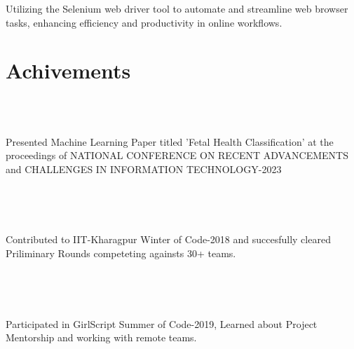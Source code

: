 \documentclass[]{BismayResume}
\begin{document}
\begin{minipage}[t]{0.70\textwidth}
\begin{tightemize}
\end{tightemize}
\sectionsep

\begin{tightemize}
\sectionsep
\item Utilizing the Selenium web driver tool to automate and streamline web browser tasks, enhancing efficiency and productivity in online workflows.

\end{tightemize}
\sectionsep

\section{Achivements}

 \\
\begin{tightemize}
\item \\ Presented Machine Learning Paper titled 'Fetal Health Classification' at the proceedings of NATIONAL CONFERENCE ON RECENT ADVANCEMENTS and CHALLENGES IN INFORMATION TECHNOLOGY-2023\\
\end{tightemize}
\sectionsep

 \\
\begin{tightemize}
\\
\item Contributed to IIT-Kharagpur Winter of Code-2018 and succesfully cleared Priliminary Rounds competeting againsts 30+ teams.
\\
\end{tightemize}
\sectionsep

 \\
\begin{tightemize}
\\
\item Participated in GirlScript Summer of Code-2019, Learned about Project Mentorship and working with remote teams.
\\
\end{tightemize}
\sectionsep


\end{minipage}
\end{document}
